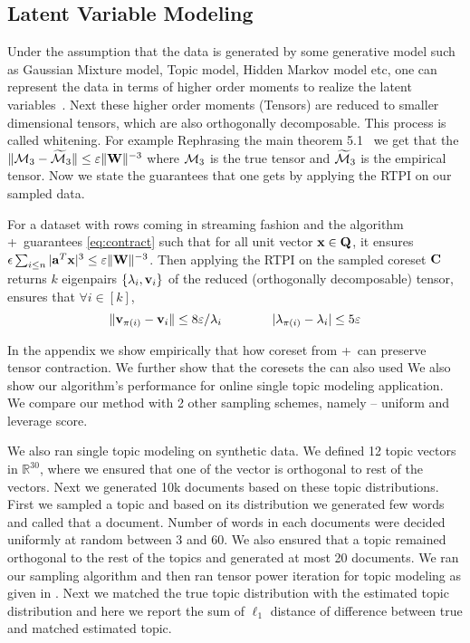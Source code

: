 \subsection{Latent Variable Modeling}{\label{sec:application}}
Under the assumption that the data is generated by some generative model such as Gaussian Mixture model, Topic model, Hidden Markov model etc, one can represent the data in terms of higher order moments to realize the latent variables~\cite{anandkumar2014tensor}. Next these higher order moments (Tensors) are reduced to smaller dimensional tensors, which are also orthogonally decomposable. This process is called whitening. For example 
Rephrasing the main theorem 5.1~\cite{anandkumar2014tensor} we get that the $\|\mathbf{\mathcal{M}}_{3} - \widetilde{\mathbf{\mathcal{M}}}_{3}\| \leq \varepsilon\|\mathbf{W}\|^{-3}$ where $\mathbf{\mathcal{M}}_{3}$ is the true tensor and $\widetilde{\mathbf{\mathcal{M}}}_{3}$ is the empirical tensor.
Now we state the guarantees that one gets by applying the RTPI on our sampled data.
\begin{corollary}{\label{coro:tensorFactors}}
 For a dataset with rows coming in streaming fashion and the algorithm \online+~guarantees \eqref{eq:contract} such that for all unit vector $\mathbf{x} \in \mathbf{Q}$, it ensures $\epsilon\sum_{i \leq n} |\mathbf{a}^{T}\mathbf{x}|^{3} \leq \varepsilon \|\mathbf{W}\|^{-3}$. Then applying the RTPI on the sampled coreset $\mathbf{C}$ returns $k$ eigenpairs $\{\lambda_{i},\mathbf{v}_{i}\}$ of the reduced (orthogonally decomposable) tensor, ensures that $\forall i \in [k]$,
 $$\|\mathbf{v}_{\pi(i)} - \mathbf{v}_{i}\| \leq 8\varepsilon/\lambda_{i} \qquad \qquad |\lambda_{\pi(i)}-\lambda_{i}| \leq 5\varepsilon$$
\end{corollary}
In the appendix we show empirically that how coreset from \online+~can preserve tensor contraction. We further show that the coresets the can also used We also show our algorithm's performance for online single topic modeling application. We compare our method with 2 other sampling schemes, namely -- uniform and leverage score. 


We also ran single topic modeling on synthetic data. We defined 12 topic vectors in $\mathbb{R}^{30}$, where we ensured that one of the vector is orthogonal to rest of the vectors. Next we generated 10k documents based on these topic distributions. First we sampled a topic and based on its distribution we generated few words and called that a document. Number of words in each documents were decided uniformly at random between 3 and 60. We also ensured that a topic  remained orthogonal to the rest of the topics and generated at most 20 documents. We ran our sampling algorithm and then ran tensor power iteration for topic modeling as given in \cite{anandkumar2014tensor}. Next we matched the true topic distribution with the estimated topic distribution and here we report the sum of $\ell_{1}$ distance of difference between true and matched estimated topic.

